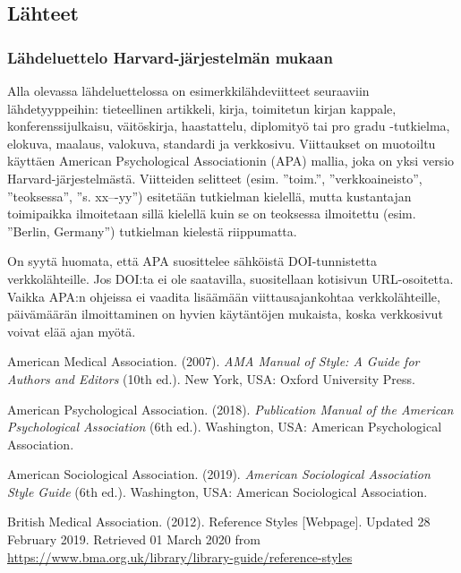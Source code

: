 \documentclass[finnish, 12pt, a4paper, elec, utf8, a-2b, online]{aaltothesis}
\begin{document}
\subsection*{Lähteet}
\subsubsection*{Lähdeluettelo Harvard-järjestelmän mukaan}

Alla olevassa lähdeluettelossa on esimerkkilähdeviitteet seuraaviin 
lähdetyyppeihin: tieteellinen artikkeli, kirja, toimitetun kirjan kappale, 
konferenssijulkaisu, väitöskirja, haastattelu, diplomityö tai pro gradu 
-tutkielma, elokuva, maalaus, valokuva, standardi ja verkkosivu. Viittaukset on 
muotoiltu käyttäen American Psychological Associationin (APA) mallia, joka on 
yksi versio Harvard-järjestelmästä. Viitteiden selitteet (esim. ”toim.”, 
”verkkoaineisto”, ”teoksessa”, ”s. xx–-yy”) esitetään tutkielman kielellä, mutta
kustantajan toimipaikka ilmoitetaan sillä kielellä kuin se on teoksessa 
ilmoitettu (esim. ”Berlin, Germany”) tutkielman kielestä riippumatta.

On syytä huomata, että APA suosittelee sähköistä DOI-tunnistetta 
verkkolähteille. Jos DOI:ta ei ole saatavilla, suositellaan kotisivun 
URL-osoitetta. Vaikka APA:n ohjeissa ei vaadita lisäämään viittausajankohtaa 
verkkolähteille, päivämäärän ilmoittaminen on hyvien käytäntöjen mukaista, koska
verkkosivut voivat elää ajan myötä.

\vspace{1ex}
\noindent
American Medical Association. (2007). 
\textit{AMA Manual of Style: A Guide for Authors and Editors} 
(10th ed.). New York, USA: Oxford University Press.

\vspace{1ex}
\noindent
American Psychological Association. (2018). 
\textit{Publication Manual of the American Psychological Association} 
(6th ed.). Washington, USA: American Psychological Association.

\vspace{1ex}
\noindent
American Sociological Association. (2019). 
\textit{American Sociological Association Style Guide} 
(6th ed.). Washington, USA: American Sociological Association.

\vspace{1ex}
\noindent
British Medical Association. (2012). 
Reference Styles [Webpage]. Updated 28 February 2019. 
Retrieved 01 March 2020 from 
\url{https://www.bma.org.uk/library/library-guide/reference-styles}
\end{document}
